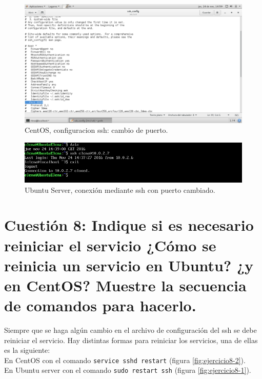 \begin{figure}[H] 
	\centering
	\includegraphics[width=15cm]{./img/ejercicio7-7.png} 	
	\caption{CentOS, configuracion ssh: cambio de puerto.} \label{fig:ejercicio7-7}
\end{figure}

\begin{figure}[H] 
	\centering
	\includegraphics[width=15cm]{./img/ejercicio7-5.png} 	
	\caption{Ubuntu Server, conexión mediante ssh con puerto cambiado.} \label{fig:ejercicio7-5}
\end{figure}


\section{Cuestión 8: Indique si es necesario reiniciar el servicio ¿Cómo se reinicia un servicio en Ubuntu? ¿y en CentOS? Muestre la secuencia de comandos para hacerlo.}
Siempre que se haga algún cambio en el archivo de configuración del ssh se debe reiniciar el servicio. Hay distintas formas para reiniciar los servicios, una de ellas es la siguiente:\\

En CentOS con el comando \texttt{service sshd restart} (figura \ref{fig:ejercicio8-2}).\\
En Ubuntu server con el comando \texttt{sudo restart ssh} (figura \ref{fig:ejercicio8-1}).


